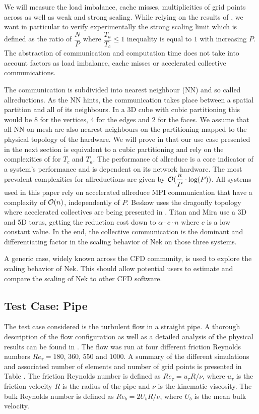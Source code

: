 \documentclass{sig-alternate}
\begin{document}
We will measure the load imbalance, cache misses, multiplicities of grid points
across as well as weak and strong scaling.
While relying on the results of \cite{tufo:terascale}, we want in particular to verify
experimentally the strong scaling limit which is defined as the ratio of $\dfrac{N}{P}$ where
$\dfrac{T_a}{T_c}\leq 1$ inequality is equal to $1$ with increasing $P$. The
abstraction of communication and computation time does not take into account
factors as load imbalance, cache misses or accelerated collective communications.

The communication is subdivided into nearest neighbour (NN) and so called
allreductions. As the NN hints, the communication takes place between a spatial
partition and all of its neighbours. In a 3D cube with cubic partitioning this
would be 8 for the vertices, 4 for the edges and 2 for the faces. We assume that
all NN on mesh are also nearest neighbours on the partitioning mapped to the
physical topology of the hardware. We will prove in 
that our use case presented in the next section is equivalent to a cubic
partitioning and rely on the complexities of \cite{fischer:scaling} for $T_c$ and
$T_a$. The performance of allreduce is a core indicator of a system's
performance and is dependent on its network hardware. The most prevalent
complexities for allreductions are given by $\mathcal{O}(\dfrac{n}{P}\cdot \log(P))$. All
systems used in this paper rely on accelerated allreduce MPI communication that have
a complexity of $\mathcal{O}(n)$, independently of $P$. Beskow uses the dragonfly
topology where accelerated collectives are being presented in
\cite{jain2012collectives}. Titan and Mira use a 3D and 5D torus, getting the
reduction cost down to $\alpha \cdot c \cdot n$ where $c$ is a low constant
value. In the end, the collective communication is the dominant and
differentiating factor in the scaling behavior of Nek on those three systems.

A generic case, widely known across the CFD community, is used to explore the
scaling behavior of Nek. This should allow potential users to estimate and
compare the scaling of Nek to other CFD software.
\subsection{Test Case: Pipe}
\label{sec:pipe}

The test case considered is the turbulent flow in a straight pipe. A thorough description of the flow configuration as well as a detailed analysis of the physical results can be found in \cite{Khoury2013}. The flow was run at four different friction Reynolds numbers $Re_{\tau} = 180$, $360$, $550$ and $1000$. A summary of the different simulations and associated number of elements and number of grid points is presented in Table . The friction Reynolds number is defined as $Re_{\tau} = u_{\tau} R / \nu$, where $u_{\tau}$ is the friction velocity $R$ is the radius of the pipe and  $\nu$ is the kinematic viscosity. The bulk Reynolds number is defined as $Re_{b} = 2 U_b R / \nu$, where $U_b$ is the mean bulk velocity. 
\end{document}
